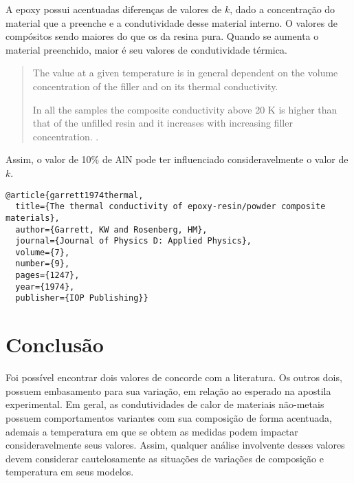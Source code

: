 \documentclass[11pt]{article}
\begin{document}
A epoxy possui acentuadas diferenças de valores de \(k\), dado a concentração do material que a preenche e a condutividade desse material interno. O valores de compósitos sendo maiores do que os da resina pura. Quando se aumenta o material preenchido, maior é seu valores de condutividade térmica.

\begin{quote}
The value at a given temperature is in general dependent on the volume concentration of the filler and on its thermal conductivity. 

In all the samples the composite conductivity above 20 K is higher than that of the unfilled resin and it increases with increasing filler concentration. \cite{garrett1974thermal}.
\end{quote}

Assim, o valor de 10\% de AlN pode ter influenciado consideravelmente o valor de \(k\).

\begin{verbatim}
@article{garrett1974thermal,
  title={The thermal conductivity of epoxy-resin/powder composite materials},
  author={Garrett, KW and Rosenberg, HM},
  journal={Journal of Physics D: Applied Physics},
  volume={7},
  number={9},
  pages={1247},
  year={1974},
  publisher={IOP Publishing}}
\end{verbatim}

\section{Conclusão}
\label{sec:org22a2d42}

Foi possível encontrar dois valores de concorde com a literatura. Os outros dois, possuem embasamento para sua variação, em relação ao esperado na apostila experimental. Em geral, as condutividades de calor de materiais não-metais possuem comportamentos variantes com sua composição de forma acentuada, ademais a temperatura em que se obtem as medidas podem impactar consideravelmente seus valores. Assim, qualquer análise involvente desses valores devem considerar cautelosamente as situações de variações de composição e temperatura em seus modelos.
\end{document}
